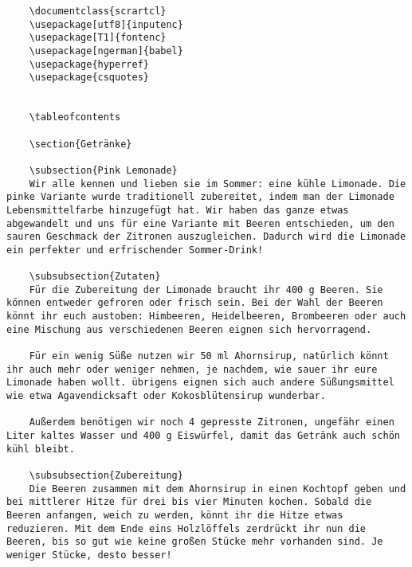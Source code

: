 \begin{verbatim}
	\documentclass{scrartcl}
	\usepackage[utf8]{inputenc}
	\usepackage[T1]{fontenc}
	\usepackage[ngerman]{babel}
	\usepackage{hyperref}
	\usepackage{csquotes}
	
	
	\tableofcontents
	
	\section{Getränke}
	
	\subsection{Pink Lemonade}
	Wir alle kennen und lieben sie im Sommer: eine kühle Limonade. Die pinke Variante wurde traditionell zubereitet, indem man der Limonade Lebensmittelfarbe hinzugefügt hat. Wir haben das ganze etwas abgewandelt und uns für eine Variante mit Beeren entschieden, um den sauren Geschmack der Zitronen auszugleichen. Dadurch wird die Limonade ein perfekter und erfrischender Sommer-Drink!
	
	\subsubsection{Zutaten}
	Für die Zubereitung der Limonade braucht ihr 400 g Beeren. Sie können entweder gefroren oder frisch sein. Bei der Wahl der Beeren könnt ihr euch austoben: Himbeeren, Heidelbeeren, Brombeeren oder auch eine Mischung aus verschiedenen Beeren eignen sich hervorragend. 
	
	Für ein wenig Süße nutzen wir 50 ml Ahornsirup, natürlich könnt ihr auch mehr oder weniger nehmen, je nachdem, wie sauer ihr eure Limonade haben wollt. übrigens eignen sich auch andere Süßungsmittel wie etwa Agavendicksaft oder Kokosblütensirup wunderbar.
	
	Außerdem benötigen wir noch 4 gepresste Zitronen, ungefähr einen Liter kaltes Wasser und 400 g Eiswürfel, damit das Getränk auch schön kühl bleibt.
	
	\subsubsection{Zubereitung}
	Die Beeren zusammen mit dem Ahornsirup in einen Kochtopf geben und bei mittlerer Hitze für drei bis vier Minuten kochen. Sobald die Beeren anfangen, weich zu werden, könnt ihr die Hitze etwas reduzieren. Mit dem Ende eins Holzlöffels zerdrückt ihr nun die Beeren, bis so gut wie keine großen Stücke mehr vorhanden sind. Je weniger Stücke, desto besser!
	

\end{verbatim}
